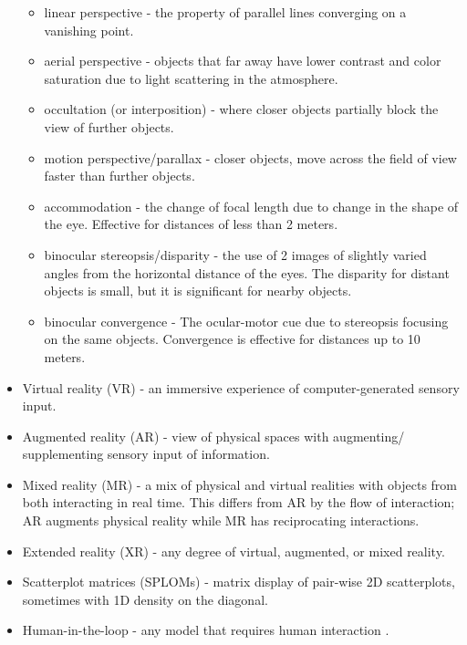 \documentclass{template/monashthesis}
\begin{document}
\begin{itemize}
  \begin{itemize}
  \tightlist
  \item
    linear perspective - the property of parallel lines converging on a vanishing point.
  \item
    aerial perspective - objects that far away have lower contrast and color saturation due to light scattering in the atmosphere.
  \item
    occultation (or interposition) - where closer objects partially block the view of further objects.
  \item
    motion perspective/parallax - closer objects, move across the field of view faster than further objects.
  \item
    accommodation - the change of focal length due to change in the shape of the eye. Effective for distances of less than 2 meters.
  \item
    binocular stereopsis/disparity - the use of 2 images of slightly varied angles from the horizontal distance of the eyes. The disparity for distant objects is small, but it is significant for nearby objects.
  \item
    binocular convergence - The ocular-motor cue due to stereopsis focusing on the same objects. Convergence is effective for distances up to 10 meters.
  \end{itemize}
\item
  Virtual reality (VR) - an immersive experience of computer-generated sensory input.
\item
  Augmented reality (AR) - view of physical spaces with augmenting/ supplementing sensory input of information.
\item
  Mixed reality (MR) - a mix of physical and virtual realities with objects from both interacting in real time. This differs from AR by the flow of interaction; AR augments physical reality while MR has reciprocating interactions.
\item
  Extended reality (XR) - any degree of virtual, augmented, or mixed reality.
\item
  Scatterplot matrices (SPLOMs) - matrix display of pair-wise 2D scatterplots, sometimes with 1D density on the diagonal.
\item
  Human-in-the-loop - any model that requires human interaction \autocite{karwowski_international_2006}.
\end{itemize}

\printbibliography[heading=bibintoc]
\end{document}
